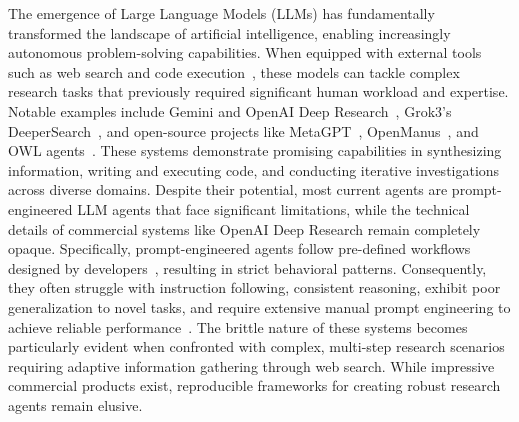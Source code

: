 \documentclass{article}
\begin{document}
The emergence of Large Language Models (LLMs) has fundamentally transformed the landscape of artificial intelligence, enabling increasingly autonomous problem-solving capabilities. When equipped with external tools such as web search and code execution~\cite{li2025torlscalingtoolintegratedrl}, these models can tackle complex research tasks that previously required significant human workload and expertise. Notable examples include Gemini and OpenAI Deep Research~\cite{google2024gemini, openai2025deep}, Grok3's DeeperSearch~\cite{xai2025grok}, and open-source projects like MetaGPT~\cite{hong2024metagpt}, OpenManus~\cite{openmanus2025}, and OWL agents~\cite{owl2025}. These systems demonstrate promising capabilities in synthesizing information, writing and executing code, and conducting iterative investigations across diverse domains.
Despite their potential, most current agents are prompt-engineered LLM agents that face significant limitations, while the technical details of commercial systems like OpenAI Deep Research remain completely opaque. Specifically, prompt-engineered agents follow pre-defined workflows designed by developers~\cite{anthropic2024building}, resulting in strict behavioral patterns. Consequently, they often struggle with instruction following, consistent reasoning, exhibit poor generalization to novel tasks, and require extensive manual prompt engineering to achieve reliable performance~\cite{pan2025why}. The brittle nature of these systems becomes particularly evident when confronted with complex, multi-step research scenarios requiring adaptive information gathering through web search. While impressive commercial products exist, reproducible frameworks for creating robust research agents remain elusive.
\end{document}
